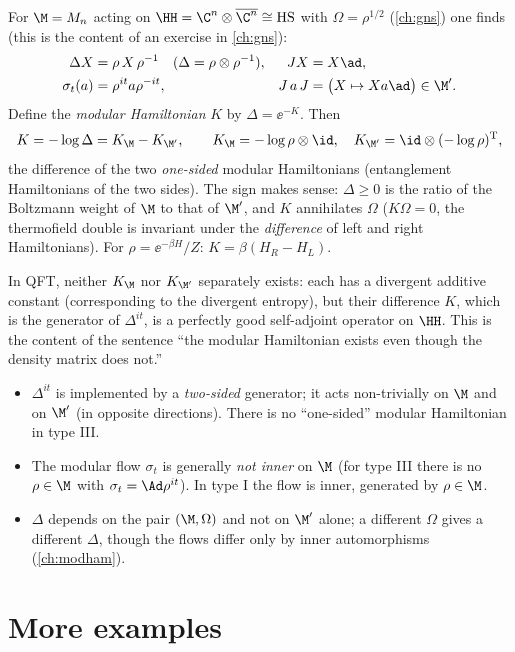 For $\M=M_n$ acting on $\HH=\C^n\otimes\overline{\C^n}\cong\mathrm{HS}$ with $\Omega=\rho^{1/2}$ (\cref{ch:gns}) one finds (this is the content of an exercise in \cref{ch:gns}):
\begin{align}
\Delta X&=\rho\,X\,\rho^{-1}\quad(\Delta=\rho\otimes\rho^{-1}),&JX&=X\ad,\\
\sigma_t(a)&=\rho^{it}a\rho^{-it},&J\,a\,J&=\big(X\mapsto Xa\ad\big)\in\M'.
\end{align}
Define the \emph{modular Hamiltonian} $K$ by $\Delta=\ee^{-K}$. Then
\begin{equation}
K=-\log\Delta=K_{\M}-K_{\M'},\qquad K_\M=-\log\rho\otimes\id,\quad K_{\M'}=\id\otimes(-\log\rho)^{\rm T},
\end{equation}
the difference of the two \emph{one-sided} modular Hamiltonians (entanglement Hamiltonians of the two sides). The sign makes sense: $\Delta\ge0$ is the ratio of the Boltzmann weight of $\M$ to that of $\M'$, and $K$ annihilates $\Omega$ ($K\Omega=0$, the thermofield double is invariant under the \emph{difference} of left and right Hamiltonians). For $\rho=\ee^{-\beta H}/Z$: $K=\beta(H_R-H_L)$.

In QFT, neither $K_\M$ nor $K_{\M'}$ separately exists: each has a divergent additive constant (corresponding to the divergent entropy), but their difference $K$, which is the generator of $\Delta^{it}$, is a perfectly good self-adjoint operator on $\HH$. This is the content of the sentence ``the modular Hamiltonian exists even though the density matrix does not.''

\begin{whatwrong}
\begin{itemize}
\item $\Delta^{it}$ is implemented by a \emph{two-sided} generator; it acts non-trivially on $\M$ and on $\M'$ (in opposite directions). There is no ``one-sided'' modular Hamiltonian in type III.
\item The modular flow $\sigma_t$ is generally \emph{not inner} on $\M$ (for type III there is no $\rho\in\M$ with $\sigma_t=\Ad\rho^{it}$). In type I the flow is inner, generated by $\rho\in\M$.
\item $\Delta$ depends on the pair $(\M,\Omega)$ and not on $\M'$ alone; a different $\Omega$ gives a different $\Delta$, though the flows differ only by inner automorphisms (\cref{ch:modham}).
\end{itemize}
\end{whatwrong}

\section{More examples}

